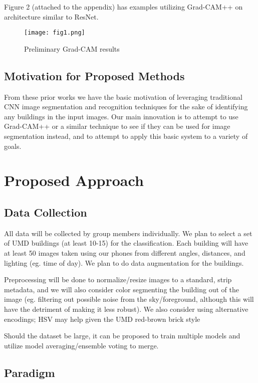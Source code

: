 \documentclass{article}
\begin{document}
Figure 2 (attached to the appendix) has examples utilizing Grad-CAM++ on architecture similar to ResNet.

\begin{figure}
    \centering
    \texttt{[image: fig1.png]}
    \caption{Preliminary Grad-CAM results}
    \label{fig:prelim_results_1}
\end{figure}

\subsection{Motivation for Proposed Methods}

From these prior works we have the basic motivation of leveraging traditional CNN image segmentation and recognition techniques for the sake of identifying any buildings in the input images. Our main innovation is to attempt to use Grad-CAM++ or a similar technique to see if they can be used for image segmentation instead, and to attempt to apply this basic system to a variety of goals.

\section{Proposed Approach}
\label{approach}

\subsection{Data Collection}

All data will be collected by group members individually. We plan to select a set of UMD buildings (at least 10-15) for the classification. Each building will have at least 50 images taken using our phones from different angles, distances, and lighting (eg. time of day). We plan to do data augmentation for the buildings. 

Preprocessing will be done to normalize/resize images to a standard, strip metadata, and we will also consider color segmenting the building out of the image (eg. filtering out possible noise from the sky/foreground, although this will have the detriment of making it less robust). We also consider using alternative encodings; HSV may help given the UMD red-brown brick style

Should the dataset be large, it can be proposed to train multiple models and utilize model averaging/ensemble voting to merge.

\subsection{Paradigm}
\end{document}
